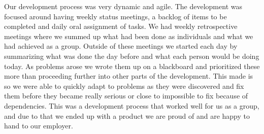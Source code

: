 Our development process was very dynamic and agile.
The development was focused around having weekly status meetings, a backlog of items to be completed and daily oral assignment of tasks.
We had weekly retrospective meetings where we summed up what had been done as individuals and what we had achieved as a group.
Outside of these meetings we started each day by summarizing what was done the day before and what each person would be doing today.
As problems arose we wrote them up on a blackboard and prioritized these more than proceeding further into other parts of the development.
This made is so we were able to quickly adapt to problems as they were discovered and fix them before they became really serious or close to impossible to fix because of dependencies.
This was a development process that worked well for us as a group, and due to that we ended up with a product we are proud of and are happy to hand to our employer.
